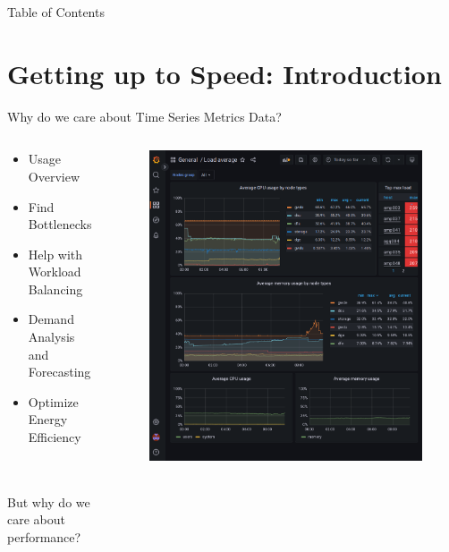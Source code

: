 \documentclass[compress,aspectratio=169]{beamer}
\begin{document}
\begin{frame}[plain]
	\titlepage
\end{frame}

\begin{frame}[t]{Table of Contents}
  \tableofcontents[subsectionstyle=hide/hide]
\end{frame}


\section[Introduction]{Getting up to Speed: Introduction}
\begin{frame}{Why do we care about Time Series Metrics Data?}
\begin{columns}[T]
\begin{column}{0.5\textwidth}
\begin{itemize}
  \item Usage Overview
  \item Find Bottlenecks
  \item Help with Workload Balancing
  \item Demand Analysis and Forecasting
  \item Optimize Energy Efficiency
\end{itemize}
~\\~\\
\pause
But why do we care about performance?
\end{column}
\begin{column}{0.5\textwidth}
\begin{figure}
  \includegraphics[height=.8\textheight]{example_grafana_dashboard.png}
\end{figure}
\end{column}
\end{columns}
\end{frame}
\end{document}
